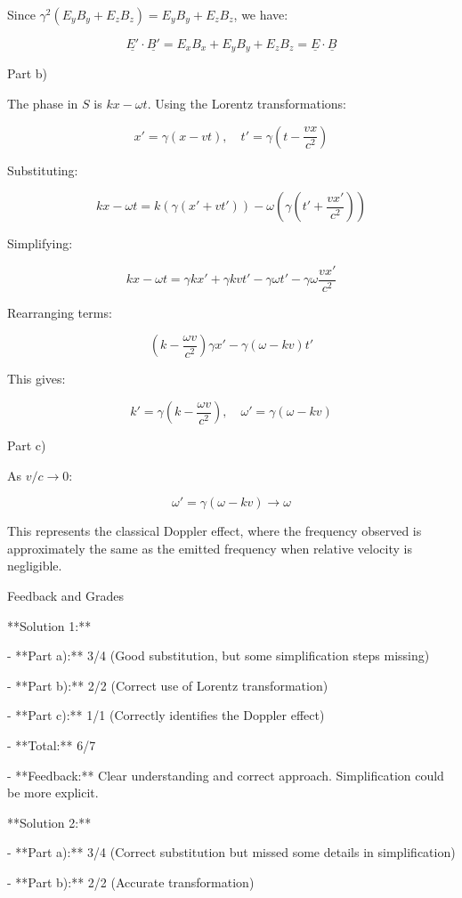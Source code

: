 \documentclass[a4paper,11pt]{article}
\begin{document}
Since \(\gamma^2 (E_{y} B_{y} + E_{z} B_{z}) = E_{y} B_{y} + E_{z} B_{z}\), we have:

\[
\underline{E'} \cdot \underline{B'} = E_{x} B_{x} + E_{y} B_{y} + E_{z} B_{z} = \underline{E} \cdot \underline{B}
\]

Part b)

The phase in \( S \) is \( kx - \omega t \). Using the Lorentz transformations:

\[
x' = \gamma(x - vt), \quad t' = \gamma(t - \frac{vx}{c^{2}})
\]

Substituting:

\[
kx - \omega t = k(\gamma(x' + vt')) - \omega(\gamma(t' + \frac{vx'}{c^2}))
\]

Simplifying:

\[
kx - \omega t = \gamma kx' + \gamma kvt' - \gamma \omega t' - \gamma \omega \frac{vx'}{c^2}
\]

Rearranging terms:

\[
(k - \frac{\omega v}{c^2})\gamma x' - \gamma(\omega - kv)t'
\]

This gives:

\[
k' = \gamma(k - \frac{\omega v}{c^2}), \quad \omega' = \gamma(\omega - kv)
\]

Part c)

As \( v/c \rightarrow 0 \):

\[
\omega' = \gamma (\omega - kv) \rightarrow \omega
\]

This represents the classical Doppler effect, where the frequency observed is approximately the same as the emitted frequency when relative velocity is negligible.

Feedback and Grades

**Solution 1:**

- **Part a):** 3/4 (Good substitution, but some simplification steps missing)

- **Part b):** 2/2 (Correct use of Lorentz transformation)

- **Part c):** 1/1 (Correctly identifies the Doppler effect)

- **Total:** 6/7

- **Feedback:** Clear understanding and correct approach. Simplification could be more explicit.

**Solution 2:**

- **Part a):** 3/4 (Correct substitution but missed some details in simplification)

- **Part b):** 2/2 (Accurate transformation)
\end{document}
